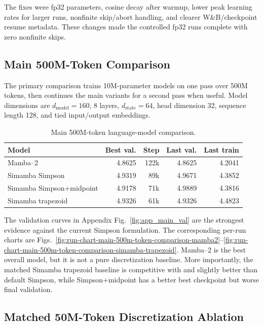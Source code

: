 \documentclass[conference]{IEEEtran}
\newcommand{\modelname}{Simamba\xspace}
\newcommand{\mambatwo}{Mamba--2\xspace}
\begin{document}
The fixes were fp32 parameters, cosine decay after warmup, lower peak learning rates for larger runs, nonfinite skip/abort handling, and clearer W\&B/checkpoint resume metadata. These changes made the controlled fp32 runs complete with zero nonfinite skips.

\subsection{Main 500M-Token Comparison}

The primary comparison trains 10M-parameter models on one pass over 500M tokens, then continues the main variants for a second pass when useful. Model dimensions are $d_{\mathrm{model}}=160$, 8 layers, $d_{\mathrm{state}}=64$, head dimension 32, sequence length 128, and tied input/output embeddings.

\begin{table}[t]
\caption{Main 500M-token language-model comparison.}
\label{tab:main}
\centering
\footnotesize
\begin{tabular}{@{}lrrrr@{}}
\toprule
Model & Best val. & Step & Last val. & Last train\\
\midrule
\mambatwo & 4.8625 & 122k & 4.8625 & 4.2041\\
\modelname{} Simpson & 4.9319 & 89k & 4.9671 & 4.3852\\
\modelname{} Simpson+midpoint & 4.9178 & 71k & 4.9889 & 4.3816\\
\modelname{} trapezoid & 4.9326 & 61k & 4.9326 & 4.4823\\
\bottomrule
\end{tabular}
\end{table}

The validation curves in Appendix Fig.~\ref{fig:app_main_val} are the strongest evidence against the current Simpson formulation. The corresponding per-run charts are Figs.~\ref{fig:run-chart-main-500m-token-comparison-mamba2}--\ref{fig:run-chart-main-500m-token-comparison-simamba-trapezoid}. \mambatwo is the best overall model, but it is not a pure discretization baseline. More importantly, the matched \modelname trapezoid baseline is competitive with and slightly better than default Simpson, while Simpson+midpoint has a better best checkpoint but worse final validation.

\subsection{Matched 50M-Token Discretization Ablation}
\end{document}
